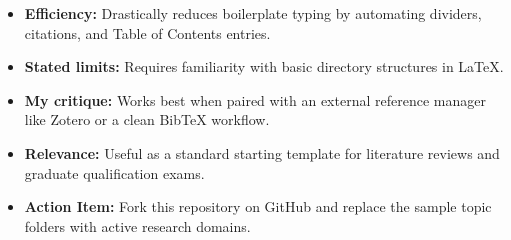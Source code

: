 \logresults
\begin{itemize}
    \item \textbf{Efficiency:} Drastically reduces boilerplate typing by automating dividers, citations, and Table of Contents entries.
\end{itemize}



\loglimitations
\begin{itemize}
    \item \textbf{Stated limits:} Requires familiarity with basic directory structures in LaTeX.
    \item \textbf{My critique:} Works best when paired with an external reference manager like Zotero or a clean BibTeX workflow.
\end{itemize}



\logtakeaways
\begin{itemize}
    \item \textbf{Relevance:} Useful as a standard starting template for literature reviews and graduate qualification exams.
    \item \textbf{Action Item:} Fork this repository on GitHub and replace the sample topic folders with active research domains.
\end{itemize}
